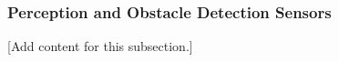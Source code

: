 
\subsubsection{Perception and Obstacle Detection Sensors}
\label{subsubsec:design_6_4_perception_obstacle_sensors}

[Add content for this subsection.]
